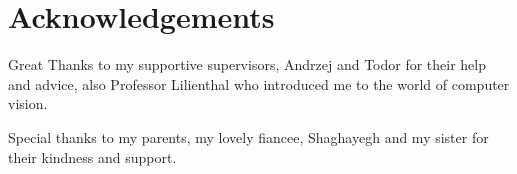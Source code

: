 \cleardoublepage
{}
{}
\chapter*{Acknowledgements}

Great Thanks to my supportive supervisors, Andrzej and Todor for their help and advice, also Professor Lilienthal who introduced me to the world of computer vision.

Special thanks to my parents, my lovely fiancee, Shaghayegh and my sister for their kindness and support. 

% 
